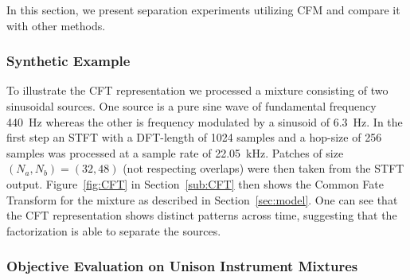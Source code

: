 {{In this section, we present separation experiments utilizing CFM and compare it with other methods.

\subsubsection{Synthetic Example}
\label{sub:Synthentic_Examples}

To illustrate the CFT representation we processed a mixture consisting of two sinusoidal sources. One source is a pure sine wave of fundamental frequency 440~Hz whereas the other is frequency modulated by a sinusoid of 6.3~Hz. In the first step an STFT with a DFT-length of 1024 samples and a hop-size of 256 samples was processed at a sample rate of 22.05~kHz. Patches of size $(N_a, N_b) = (32, 48)$ (not respecting overlaps) were then taken from the STFT output. Figure~\ref{fig:CFT} in Section~\ref{sub:CFT} then shows the Common Fate Transform for the mixture as described in Section~\ref{sec:model}. One can see that the CFT representation shows distinct patterns across time, suggesting that the factorization is able to separate the sources.


\subsubsection{Objective Evaluation on Unison Instrument Mixtures}

}}
